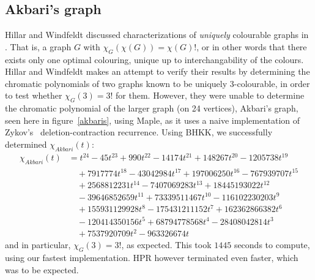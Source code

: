 \documentclass[a4paper]{article}
\begin{document}
\subsection{Akbari's graph}
Hillar and Windfeldt discussed characterizations of \emph{uniquely} colourable graphs in \cite{hillar_windfeldt}. That is, a graph $G$ with $\chi_G(\chi(G)) = \chi(G)!$, or in other words that there exists only one optimal colouring, unique up to interchangability of the colours. Hillar and Windfeldt makes an attempt to verify their results by determining the chromatic polynomials of two graphs known to be uniquely 3-colourable, in order to test whether $\chi_G(3) = 3!$ for them. However, they were unable to determine the chromatic polynomial of the larger graph (on 24 vertices), Akbari's graph, seen here in figure~\ref{akbaris}, using Maple, as it uses a naive implementation of Zykov's~\cite{aazykov} deletion-contraction recurrence. Using BHKK, we successfully determined $\chi_{Akbari}(t)$:
\begin{equation*}
\begin{split}
\chi_{Akbari}(t) & =  t^{24} - 45t^{23} + 990t^{22} -14174t^{21} + 148267t^{20} - 1205738t^{19} \\ & \quad
+ 7917774t^{18} - 43042984t^{17} + 197006250t^{16} - 767939707t^{15} \\ & \quad 
+ 2568812231t^{14}  - 7407069283t^{13} 
+ 18445193022t^{12} \\ & \quad
- 39646852659t^{11} + 73339511467t^{10} - 116102230203t^9 \\ & \quad
+ 155931129928t^8 - 175431211152t^7 + 162362866382t^6 \\ & \quad - 120414350156t^5 
+ 68794778568t^4 - 28408042814t^3 \\ & \quad + 7537920709t^2 - 963326674t
\end{split}
\end{equation*}
and in particular, $\chi_G(3) = 3!$, as expected. This took $1445$ seconds to compute, using our fastest implementation. HPR however terminated even faster, which was to be expected.
\end{document}
